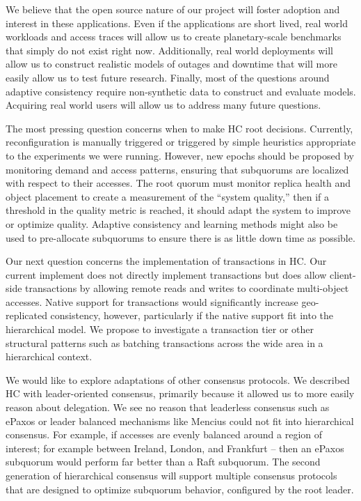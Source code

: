 We believe that the open source nature of our project will foster adoption and interest in these applications.
Even if the applications are short lived, real world workloads and access traces will allow us to create planetary-scale benchmarks that simply do not exist right now.
Additionally, real world deployments will allow us to construct realistic models of outages and downtime that will more easily allow us to test future research.
Finally, most of the questions around adaptive consistency require non-synthetic data to construct and evaluate models.
Acquiring real world users will allow us to address many future questions.

The most pressing question concerns when to make HC root decisions.
Currently, reconfiguration is manually triggered or triggered by simple heuristics appropriate to the experiments we were running.
However, new epochs should be proposed by monitoring demand and access patterns, ensuring that subquorums are localized with respect to their accesses.
The root quorum must monitor replica health and object placement to create a measurement of the ``system quality,'' then if a threshold in the quality metric is reached, it should adapt the system to improve or optimize quality.
Adaptive consistency and learning methods might also be used to pre-allocate subquorums to ensure there is as little down time as possible.

Our next question concerns the implementation of transactions in HC.
Our current implement does not directly implement transactions but does allow client-side transactions by allowing remote reads and writes to coordinate multi-object accesses.
Native support for transactions would significantly increase geo-replicated consistency, however, particularly if the native support fit into the hierarchical model.
We propose to investigate a transaction tier or other structural patterns such as batching transactions across the wide area in a hierarchical context.

We would like to explore adaptations of other consensus protocols.
We described HC with leader-oriented consensus, primarily because it allowed us to more easily reason about delegation.
We see no reason that leaderless consensus such as ePaxos or leader balanced mechanisms like Mencius could not fit into hierarchical consensus.
For example, if accesses are evenly balanced around a region of interest; for example between Ireland, London, and Frankfurt -- then an ePaxos subquorum would perform far better than a Raft subquorum.
The second generation of hierarchical consensus will support multiple consensus protocols that are designed to optimize subquorum behavior, configured by the root leader.

